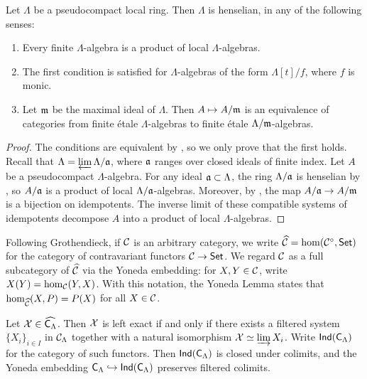 \begin{lemma}
Let $\Lambda$ be a pseudocompact local ring. Then $\Lambda$ is henselian, in 
any of the following senses:
\begin{enumerate}
\item
Every finite $\Lambda$-algebra is a product of local $\Lambda$-algebras.

\item
The first condition is satisfied for $\Lambda$-algebras of the form 
$\Lambda[t]/f$, where $f$ is monic. 

\item
Let $\mathfrak{m}$ be the maximal ideal of $\Lambda$. Then $A\mapsto A/\mathfrak{m}$ is an 
equivalence of categories from finite \'etale $\Lambda$-algebras to 
finite \'etale $\Lambda/\mathfrak{m}$-algebras. 
\end{enumerate}
\end{lemma}
\begin{proof}
The conditions are equivalent by \cite[18.5.11]{ega4-4}, so we only prove 
that the first holds. Recall that 
$\Lambda = \varprojlim \Lambda/\mathfrak{a}$, where $\mathfrak{a}$ ranges over closed ideals of 
finite index. Let $A$ be a pseudocompact $\Lambda$-algebra. For any 
ideal $\mathfrak{a}\subset \Lambda$, the ring $\Lambda/\mathfrak{a}$ is henselian by 
\cite[18.5.14]{ega4-4}, so $A/\mathfrak{a}$ is a product of local 
$\Lambda/\mathfrak{a}$-algebras. Moreover, by \cite[18.5.4]{ega4-4}, the map 
$A/\mathfrak{a} \to A/\mathfrak{m}$ is a bijection on idempotents. The inverse limit of 
these compatible systems of idempotents decompose $A$ into a product of local 
$\Lambda$-algebras. 
\end{proof}

Following Grothendieck, if $\mathcal{C}$ is an arbitrary category, we write 
$\widehat{\mathcal{C}}=\hom(\mathcal{C}^\circ,\mathsf{Set})$ for the category of contravariant functors 
$\mathcal{C}\to \mathsf{Set}$. We regard $\mathcal{C}$ as a full subcategory of $\widehat{\mathcal{C}}$ via the 
Yoneda embedding: for $X,Y\in \mathcal{C}$, write $X(Y) = \hom_{\mathcal{C}}(Y,X)$. With 
this notation, the Yoneda Lemma states that $\hom_{\widehat{\mathcal{C}}}(X,P) = P(X)$ 
for all $X\in \mathcal{C}$. 

\begin{lemma}\label{thm:ind-object-def}
Let $\mathcal{X}\in\widehat{\mathsf{C}_\Lambda}$. Then $\mathcal{X}$ is left exact if and only 
if there exists a filtered system $\{X_i\}_{i\in I}$ in $\mathcal{C}_\Lambda$ together 
with a natural isomorphism $\mathcal{X}\simeq \varinjlim X_i$. Write 
$\operatorname{\mathsf{Ind}}(\mathsf{C}_\Lambda)$ for the category of such functors. Then 
$\operatorname{\mathsf{Ind}}(\mathsf{C}_\Lambda)$ is closed under colimits, and the 
Yoneda embedding $\mathsf{C}_\Lambda\hookrightarrow\operatorname{\mathsf{Ind}}(\mathsf{C}_\Lambda)$ 
preserves filtered colimits.
\end{lemma}

